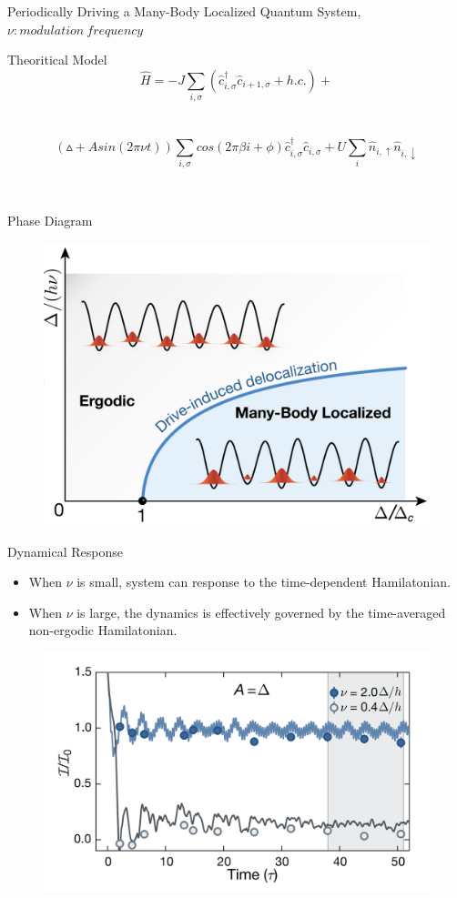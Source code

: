 \documentclass{beamer}
\begin{document}
\begin{frame}
Periodically Driving a Many-Body Localized Quantum System,$\nu:modulation\ frequency$
\begin{block}{Theoritical Model}
$$\hat{H}=-J\sum_{i,\sigma}(\hat{c}_{i,\sigma}^{\dagger}\hat{c}_{i+1,\sigma}+h.c.)+$$\\~
$$(\vartriangle+A sin(2\pi\nu t)) \sum_{i,\sigma}cos(2\pi\beta i+\phi)\hat{c}_{i,\sigma}^{\dagger}\hat{c}_{i,\sigma}+U\sum_{i}\hat{n}_{i,\uparrow}\hat{n}_{i,\downarrow}$$
\end{block}
~\\
\end{frame}


\begin{frame}{Phase Diagram}
    \begin{figure}
    \includegraphics[width=0.8\linewidth]{modulation}
    \end{figure}
\end{frame}

\begin{frame}{Dynamical Response}
  \begin{itemize}
    \item \small{When $\nu$ is small, system can response to the time-dependent Hamilatonian.}
    \item \small{When $\nu$ is large, the dynamics is effectively governed by the time-averaged non-ergodic Hamilatonian.}
  \end{itemize}
    \begin{figure}
    \includegraphics[width=0.8\linewidth]{Moduevolu}
    \end{figure}
\end{frame}
\end{document}
